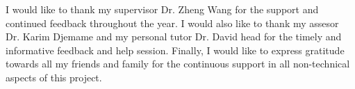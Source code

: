I would like to thank my supervisor Dr. Zheng Wang for the support and
continued feedback throughout the year. I would also like to thank my assesor
Dr. Karim Djemame and my personal tutor Dr. David head for the timely and
informative feedback and help session. Finally, I would like to express
gratitude towards all my friends and family for the continuous support in all
non-technical aspects of this project.
